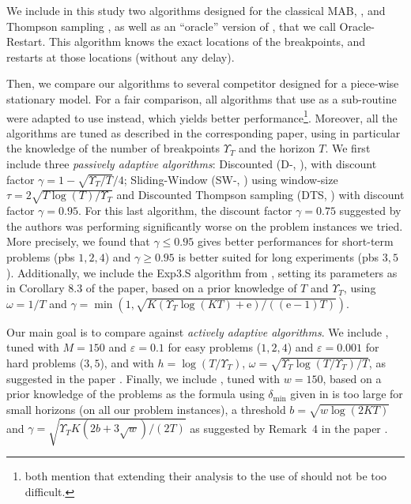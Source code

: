 We include in this study two algorithms designed for the classical MAB, \klUCB{} \cite{Garivier11KL}, and Thompson sampling \cite{AgrawalGoyal11,Kaufmann12Thompson},
as well as an ``oracle'' version of \klUCB, that we call Oracle-Restart. This algorithm knows the exact locations of the breakpoints, and restarts \klUCB{} at those locations (without any delay).

Then, we compare our algorithms to several competitor designed for a piece-wise stationary model. For a fair comparison, all algorithms that use  \UCB{} as a sub-routine were adapted to use \klUCB{} instead, which yields better performance\footnote{\cite{LiuLeeShroff17,CaoZhenKvetonXie18} both mention that extending their analysis to the use of \klUCB{} should not be too difficult.}. Moreover, all the algorithms are tuned as described in the corresponding paper, using in particular the knowledge of the number of breakpoints $\Upsilon_T$ and the horizon $T$. We first include three \emph{passively adaptive algorithms}:
Discounted \klUCB{} (D-\klUCB, \cite{Kocsis06}), with discount factor $\gamma = 1 - \sqrt{\Upsilon_T/T}/4$; Sliding-Window \klUCB{} (SW-\klUCB,  \cite{Garivier11UCBDiscount}) using window-size $\tau = 2 \sqrt{T\log(T)/\Upsilon_T}$ and Discounted Thompson sampling (DTS, \cite{RajKalyani17}) with discount factor $\gamma = 0.95$. For this last algorithm, the discount factor $\gamma=0.75$ suggested by the authors was performing significantly worse on the problem instances we tried.
More precisely, we found that $\gamma\leq0.95$ gives better performances for short-term problems (pbs $1,2,4$) and $\gamma\geq0.95$ is better suited for long experiments (pbs $3,5$).
%
%
Additionally, we include the Exp3.S algorithm from \cite{Auer02NonStochastic}, setting its parameters as in Corollary 8.3 of the paper, based on a prior knowledge of $T$ and $\Upsilon_T$, using $\omega=1/T$ and $\gamma = \min(1, \sqrt{K (\Upsilon_T \log(KT) + \mathrm{e}) / ((\mathrm{e}-1)T)})$.


Our main goal is to compare against \emph{actively adaptive algorithms}. We include \CUSUMklUCB, tuned with $M=150$ and $\varepsilon=0.1$ for easy problems ($1,2,4$) and $\varepsilon=0.001$ for hard problems ($3,5$),
and with $h = \log(T/\Upsilon_T)$, $\omega = \sqrt{\Upsilon_T \log(T/\Upsilon_T) / T}$, as suggested in the paper \cite{LiuLeeShroff17}.
%
Finally, we include \MklUCB,
tuned with $w=150$, based on a prior knowledge of the problems as the formula using $\delta_{\min}$ given in \cite{CaoZhenKvetonXie18} is too large for small horizons (on all our problem instances), a threshold $b=\sqrt{w \log(2 K T)}$ and $\gamma=\sqrt{\Upsilon_T K (2 b + 3 \sqrt{w}) / (2 T)}$ as suggested by Remark~4 in the paper \cite{CaoZhenKvetonXie18}.

